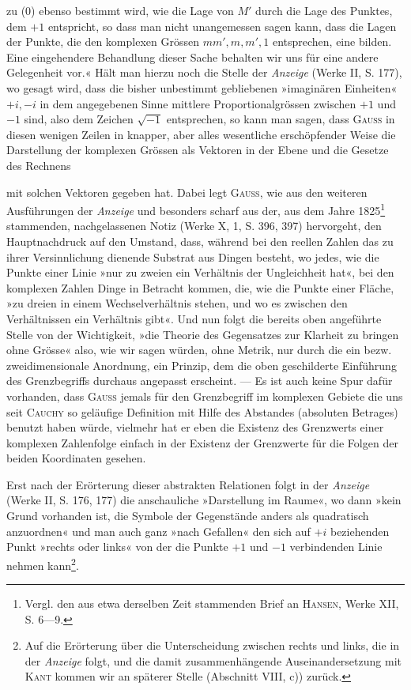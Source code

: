 zu (0) ebenso bestimmt wird, wie die Lage von \(M'\) durch die Lage des
Punktes, dem \(+1\) entspricht, so dass man nicht unangemessen sagen kann,
dass die Lagen der Punkte, die den komplexen Grössen \(mm',m,m',1\) entsprechen,
eine  bilden. Eine eingehendere Behandlung dieser
Sache behalten wir uns für eine andere Gelegenheit vor.« Hält man hierzu
noch die Stelle der \textit{Anzeige} (Werke II, S. 177), wo gesagt wird, dass die bisher
unbestimmt gebliebenen »imaginären Einheiten« \(+i,-i\) in dem angegebenen
Sinne mittlere Proportionalgrössen zwischen \(+1\) und \(-1\) sind, also dem Zeichen
\(\sqrt{-1}\) entsprechen, so kann man sagen, dass \textsc{Gauss} in diesen wenigen Zeilen
in knapper, aber alles wesentliche erschöpfender Weise die Darstellung der
komplexen Grössen als Vektoren in der Ebene und die Gesetze des Rechnens\par
\clearpage{}
\noindent mit solchen Vektoren gegeben hat. Dabei legt \textsc{Gauss}, wie aus den weiteren
Ausführungen der \textit{Anzeige} und besonders scharf aus der, aus dem Jahre 1825\footnote{Vergl. den aus etwa derselben Zeit stammenden Brief an \textsc{Hansen}, Werke XII, S. 6—9.}
stammenden, nachgelassenen Notiz (Werke X, 1, S. 396, 397) hervorgeht, den
Hauptnachdruck auf den Umstand, dass, während bei den reellen Zahlen das
zu ihrer Versinnlichung dienende Substrat aus Dingen besteht, wo jedes, wie
die Punkte einer Linie »nur zu zweien ein Verhältnis der Ungleichheit hat«,
bei den komplexen Zahlen Dinge in Betracht kommen, die, wie die Punkte
einer Fläche, »zu dreien in einem Wechselverhältnis stehen, und wo es zwischen
den Verhältnissen ein Verhältnis gibt«. Und nun folgt die bereits oben angeführte
Stelle von der Wichtigkeit, »die Theorie des Gegensatzes zur Klarheit
zu bringen ohne Grösse« also, wie wir sagen würden, ohne Metrik, nur durch
die ein bezw. zweidimensionale Anordnung, ein Prinzip, dem die oben geschilderte
Einführung des Grenzbegriffs durchaus angepasst erscheint. — Es
ist auch keine Spur dafür vorhanden, dass \textsc{Gauss} jemals für den Grenzbegriff
im komplexen Gebiete die uns seit \textsc{Cauchy} so geläufige Definition mit Hilfe
des Abstandes (absoluten Betrages) benutzt haben würde, vielmehr hat er eben
die Existenz des Grenzwerts einer komplexen Zahlenfolge einfach in der Existenz
der Grenzwerte für die Folgen der beiden Koordinaten gesehen.

Erst nach der Erörterung dieser abstrakten Relationen folgt in der \textit{Anzeige}
(Werke II, S. 176, 177) die anschauliche »Darstellung im Raume«, wo
dann »kein Grund vorhanden ist, die Symbole der Gegenstände anders als
quadratisch anzuordnen« und man auch ganz »nach Gefallen« den sich auf
\(+i\) beziehenden Punkt »rechts oder links« von der die Punkte \(+1\) und \(-1\)
verbindenden Linie nehmen kann\footnote{Auf die Erörterung über die Unterscheidung zwischen rechts und links, die in der \textit{Anzeige} folgt,
und die damit zusammenhängende Auseinandersetzung mit \textsc{Kant} kommen wir an späterer Stelle (Abschnitt
VIII, c)) zurück.}.
